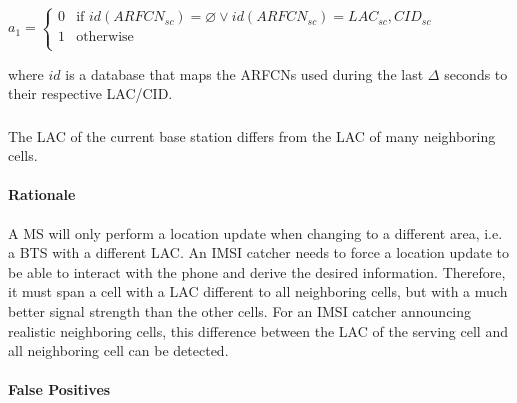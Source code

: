\documentclass[a4paper,11pt,notitlepage,bigheadings,oneside]{scrartcl}
\begin{document}
$a_1 =
\begin{cases}
	0 & \text{if } id(ARFCN_{sc}) = \varnothing \vee id(ARFCN_{sc}) = LAC_{sc},CID_{sc} \\
	1 & \text{otherwise} \\
\end{cases}$

where $id$ is a database that maps the ARFCNs used during the last $\Delta$
seconds to their respective LAC/CID.



\subsubsection{}

The LAC of the current base station differs from the LAC of many neighboring cells.

\paragraph{Rationale}

A MS will only perform a location update when changing to a different area,
i.e. a BTS with a different LAC. An IMSI catcher needs to force a location
update to be able to interact with the phone and derive the desired
information. Therefore, it must span a cell with a LAC different to all
neighboring cells, but with a much better signal strength than the other cells.
For an IMSI catcher announcing realistic neighboring cells, this difference
between the LAC of the serving cell and all neighboring cell can be detected.

\paragraph{False Positives}
\end{document}
